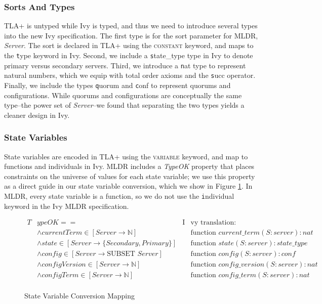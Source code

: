 \documentclass[runningheads]{llncs}
\newcommand{\tla}[1]{{\small\scshape #1}}
\newcommand{\ivy}[1]{{\texttt #1}}
\begin{document}
\subsubsection{Sorts And Types}

TLA+ is untyped while Ivy is typed, and thus we need to introduce several types into the new Ivy specification.  The first type is for the sort parameter for MLDR, \textit{Server}.  The sort is declared in TLA+ using the \tla{constant} keyword, and maps to the \ivy{type} keyword in Ivy.  Second, we include a \ivy{state\_type} type in Ivy to denote primary versus secondary servers.  Third, we introduce a \ivy{nat} type to represent natural numbers, which we equip with total order axioms and the \ivy{succ} operator.  Finally, we include the types \ivy{quorum} and \ivy{conf} to represent quorums and configurations.  While quorums and configurations are conceptually the same type--the power set of \textit{Server}--we found that separating the two types yields a cleaner design in Ivy.

\subsubsection{State Variables}

State variables are encoded in TLA+ using the \tla{variable} keyword, and map to functions and individuals in Ivy.  MLDR includes a \textit{TypeOK} property that places constraints on the universe of values for each state variable; we use this property as a direct guide in our state variable conversion, which we show in Figure \ref{fig:statevar-map}.  In MLDR, every state variable is a function, so we do not use the \ivy{individual} keyword in the Ivy MLDR specification.

\begin{figure}
  \begin{align*}
    T&ypeOK ==& \text{I}&\text{vy translation:}\\
      &\land currentTerm \in [Server \to \mathbb{N}]& &\text{function } current\_term(S:server) : nat\\
      &\land state \in [Server \to \{Secondary, Primary\}]& &\text{function } state(S:server) : state\_type\\
      &\land config \in [Server \to \text{SUBSET } Server]& &\text{function } config(S:server) : conf\\
      &\land configVersion \in [Server \to \mathbb{N}]& &\text{function } config\_version(S:server) : nat\\
      &\land configTerm \in [Server \to \mathbb{N}]& &\text{function } config\_term(S:server) : nat\\
  \end{align*}
  \caption{State Variable Conversion Mapping}
  \label{fig:statevar-map}
\end{figure}
\end{document}
